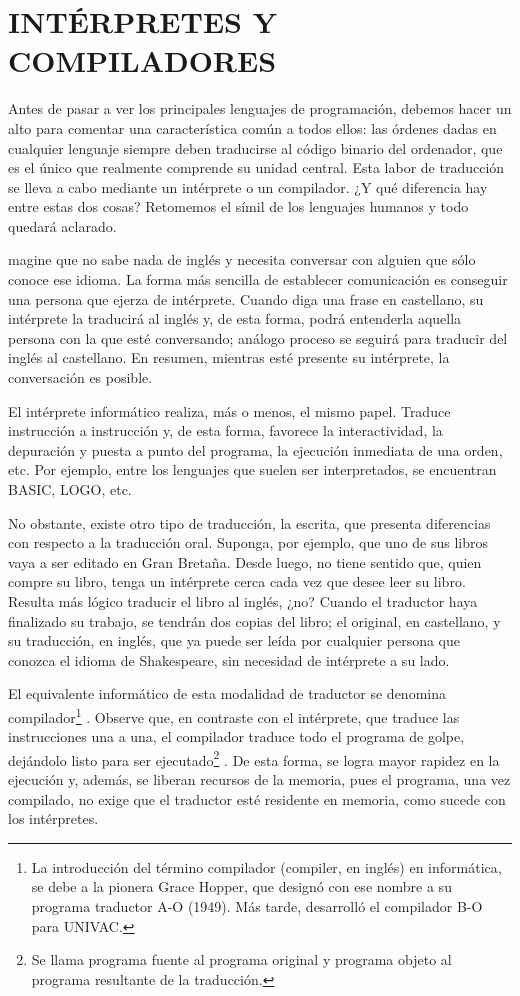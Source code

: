 \documentclass[twoside,twocolumn]{article}
\begin{document}
\section{INTÉRPRETES Y COMPILADORES}

Antes de pasar a ver los principales lenguajes de
programación, debemos hacer un alto para comentar
una característica común a todos ellos: las órdenes
dadas en cualquier lenguaje siempre deben traducirse
al código binario del ordenador, que es el único que
realmente comprende su unidad central. Esta labor de
traducción se lleva a cabo mediante un intérprete o un
compilador. ¿Y qué diferencia hay entre estas dos
cosas? Retomemos el símil de los lenguajes humanos y
todo quedará aclarado.

magine que no sabe nada de inglés y necesita conversar con alguien que sólo conoce ese idioma. La
forma más sencilla de establecer comunicación es conseguir una persona que ejerza de intérprete. Cuando
diga una frase en castellano, su intérprete la traducirá
al inglés y, de esta forma, podrá entenderla aquella
persona con la que esté conversando; análogo proceso
se seguirá para traducir del inglés al castellano. En
resumen, mientras esté presente su intérprete, la conversación es posible.

El intérprete informático realiza, más o menos, el
mismo papel. Traduce instrucción a instrucción y, de
esta forma, favorece la interactividad, la depuración y
puesta a punto del programa, la ejecución inmediata
de una orden, etc. Por ejemplo, entre los lenguajes que
suelen ser interpretados, se encuentran BASIC, LOGO,
etc.

No obstante, existe otro tipo de traducción, la escrita, que presenta diferencias con respecto a la traducción oral. Suponga, por ejemplo, que uno de sus libros
vaya a ser editado en Gran Bretaña. Desde luego, no
tiene sentido que, quien compre su libro, tenga un
intérprete cerca cada vez que desee leer su libro. Resulta más lógico traducir el libro al inglés, ¿no? Cuando el
traductor haya finalizado su trabajo, se tendrán dos
copias del libro; el original, en castellano, y su traducción, en inglés, que ya puede ser leída por cualquier
persona que conozca el idioma de Shakespeare, sin
necesidad de intérprete a su lado.

El equivalente informático de esta modalidad de
traductor se denomina compilador\footnote{La introducción del término compilador (compiler, en inglés) en informática, se debe a la pionera Grace Hopper, que designó con ese nombre a su programa traductor A-O (1949). Más tarde, desarrolló el compilador B-O para UNIVAC.} . Observe que, en
contraste con el intérprete, que traduce las instrucciones una a una, el compilador traduce todo el programa
de golpe, dejándolo listo para ser ejecutado\footnote{Se llama programa fuente al programa original y programa objeto al programa resultante de la traducción.} . De esta
forma, se logra mayor rapidez en la ejecución y, además, se liberan recursos de la memoria, pues el programa, una vez compilado, no exige que el traductor esté
residente en memoria, como sucede con los intérpretes.
\end{document}
